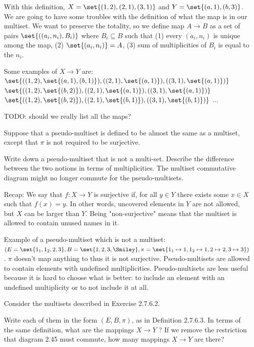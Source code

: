 \documentclass{article}
\begin{document}
    With this definition, $X = \set{(1,2),(2,1),(3,1)}$ and $Y = \set{(a,1),
    (b,3)}$.
\ei We are going to have some troubles with the definition of what the map is in
    our multiset. We want to preserve the totality, so we define map $A \to B$
    as a set of pairs $\set{((a_i, n_i), B_i)}$ where $B_i \subseteq B$ such that
    (1) every $(a_i,n_i)$ is unique among the map, (2) $\set{(a_i,n_i)} = A$,
    (3) sum of multiplicities of $B_i$ is equal to the $n_i$.

    Some examples of $X \to Y$ are:
    \es $\set{((1,2),\set{(a,1),(b,1)}),((2,1),\set{(a,1)}),((3,1),\set{(a,1)})}$
    \ei $\set{((1,2),\set{(b,2)}),((2,1),\set{(a,1)}),((3,1),\set{(a,1)})}$
    \ei $\set{((1,2),\set{(b,2)}),((2,1),\set{(b,1)}),((3,1),\set{(b,1)})}$
    \ei ...
    \ee

    TODO: should we really list all the maps?
\ee


Suppose that a pseudo-multiset is defined to be almost the same as a multiset,
except that $\pi$ is not required to be surjective.

\es Write down a pseudo-multiset that is not a multi-set.
\ei Describe the difference between the two notions in terms of multiplicities.
\ei The multiset commutative diagram might no longer commute for the
    pseudo-multisets.
\ee

\ans

Recap: We say that $f: X \to Y$ is surjective if, for all $y \in Y$ there exists
some $x \in X$ such that $f(x) = y$. In other words, uncovered elements in $Y$
are not allowed, but $X$ can be larger than $Y$.  Being "non-surjective" means
that the multiset is allowed to contain unused names in it.

\es Example of a pseudo-multiset which is not a multiset: $(E =
    \set{1_1,1_2,2,3}, B = \set{1, 2, 3, \Smiley}, \pi = \set{1_1 \mapsto 1, 1_2
    \mapsto 1, 2 \mapsto 2, 3 \mapsto 3})$. $\pi$ doesn't map anything to
    \Smiley thus it is not surjective.
\ei Pseudo-multisets are allowed to contain elements with undefined
    multiplicities.
\ei Pseudo-multisets are less useful because it is hard to choose what is
    better: to include an element with an undefined multiplicity or to not
    include it at all.
\ee


Consider the multisets described in Exercise 2.7.6.2.

\es Write each of them in the form $(E, B, \pi)$, as in Definition 2.7.6.3.
\ei In terms of the same definition, what are the mappings $X \to Y$ ?
\ei If we remove the restriction that diagram 2.45 must commute, how many
    mappings $X \to Y$ are there?
\ee
\end{document}
